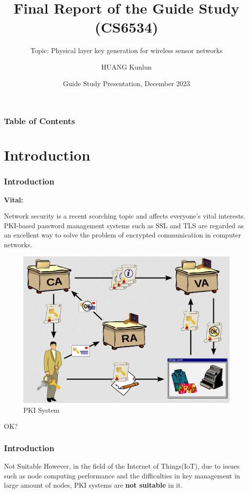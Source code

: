 \documentclass{beamer}
\title[Final Report] %
{Final Report of the Guide Study (CS6534)}
\subtitle{Topic: Physical layer key generation for wireless sensor networks}
\author[HUANG Kunlun] %
{HUANG Kunlun}
\institute[CityU HK] %
{
  {Supervisor:}

  {Professor XU Weitao}
  \and
  Department of Computer Science\\
  City University of Hong Kong
  
}
\date[Guide Study Presentation] %
{Guide Study Presentation, December 2023}
\begin{document}
\frame{\titlepage}


\begin{frame}
\frametitle{Table of Contents}
\tableofcontents
\end{frame}


\section{Introduction}

\begin{frame}
\frametitle{Introduction}
\textbf{Vital:}

Network security is a recent scorching topic and affects everyone's vital interests. PKI-based password management systems such as SSL and TLS are regarded as an excellent way to solve the problem of encrypted communication in computer networks. \pause 
\begin{figure}
  \centering
  \includegraphics[width=0.4\linewidth]{figures/pkisystem.png}
  \caption{PKI System\cite{wiki:Public_key_infrastructure}}
  \label{fig:pkisystem}
\end{figure}
OK?
\end{frame}

\begin{frame}
\frametitle{Introduction}
\begin{alertblock}{Not Suitable}
  However, in the field of the Internet of Things(IoT), due to issues such as node computing performance and the difficulties in key management in large amount of nodes, PKI systems are \textbf{not suitable} in it. 

\end{alertblock}
\vspace{0.05in}
\end{frame}
\end{document}
